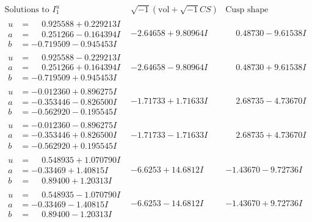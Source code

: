\documentclass[1p]{elsarticle_modified}
\theoremstyle{definition}
\newcommand{\I}{\sqrt{-1}}
\begin{document}
$$\begin{array}{c|c|c}  
\text{Solutions to }I^u_{1}& \I (\text{vol} + \sqrt{-1}CS) & \text{Cusp shape}\\
 \hline 
\begin{aligned}
u &= \phantom{-}0.925588 + 0.229213 I \\
a &= \phantom{-}0.251266 - 0.164394 I \\
b &= -0.719509 - 0.945453 I\end{aligned}
 & -2.64658 + 9.80964 I & \phantom{-}0.48730 - 9.61538 I \\ \hline\begin{aligned}
u &= \phantom{-}0.925588 - 0.229213 I \\
a &= \phantom{-}0.251266 + 0.164394 I \\
b &= -0.719509 + 0.945453 I\end{aligned}
 & -2.64658 - 9.80964 I & \phantom{-}0.48730 + 9.61538 I \\ \hline\begin{aligned}
u &= -0.012360 + 0.896275 I \\
a &= -0.353446 - 0.826500 I \\
b &= -0.562920 - 0.195545 I\end{aligned}
 & -1.71733 + 1.71633 I & \phantom{-}2.68735 - 4.73670 I \\ \hline\begin{aligned}
u &= -0.012360 - 0.896275 I \\
a &= -0.353446 + 0.826500 I \\
b &= -0.562920 + 0.195545 I\end{aligned}
 & -1.71733 - 1.71633 I & \phantom{-}2.68735 + 4.73670 I \\ \hline\begin{aligned}
u &= \phantom{-}0.548935 + 1.070790 I \\
a &= -0.33469 + 1.40815 I \\
b &= \phantom{-}0.89400 + 1.20313 I\end{aligned}
 & -6.6253 + 14.6812 I & -1.43670 - 9.72736 I \\ \hline\begin{aligned}
u &= \phantom{-}0.548935 - 1.070790 I \\
a &= -0.33469 - 1.40815 I \\
b &= \phantom{-}0.89400 - 1.20313 I\end{aligned}
 & -6.6253 - 14.6812 I & -1.43670 + 9.72736 I \\ \hline\begin{aligned}

\end{aligned}
\end{array}$$
\end{document}
